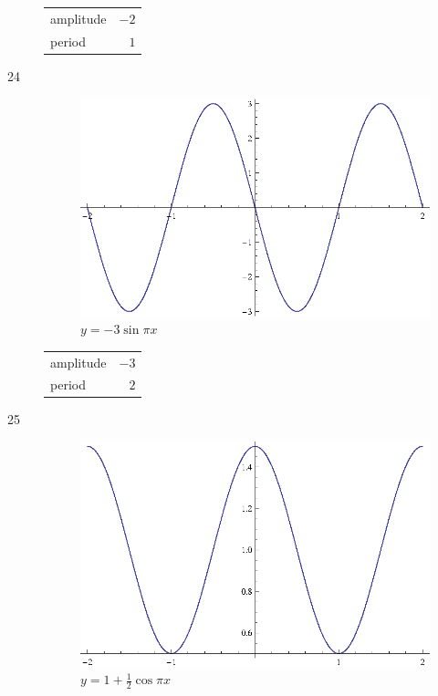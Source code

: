 \documentclass{exam}
\begin{document}
\begin{description}
        \begin{tabular}[H]{lr}
          \toprule
          amplitude & $-2$ \\
          period    & $1$ \\
          \bottomrule
        \end{tabular}

      \item[24]
        \begin{figure}[H]
          \centering
          \includegraphics[scale=0.9]{exercise24.eps}
          \caption{$y = -3 \sin \pi x$}
        \end{figure}

        \begin{tabular}[H]{lr}
          \toprule
          amplitude & $-3$ \\
          period    & $2$ \\
          \bottomrule
        \end{tabular}

      \item[25]
        \begin{figure}[H]
          \centering
          \includegraphics[scale=0.9]{exercise25.eps}
          \caption{$y = 1 + \frac{1}{2} \cos \pi x$}
        \end{figure}


\end{description}
\end{document}
